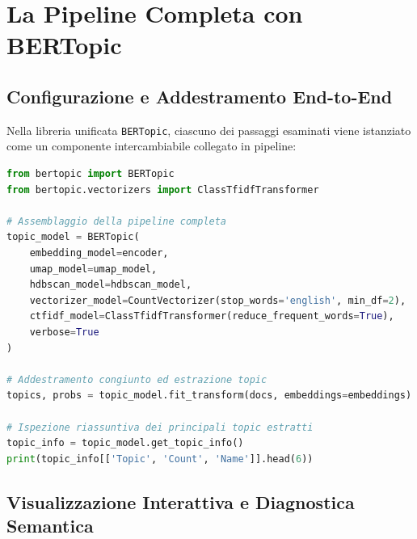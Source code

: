 \FloatBarrier
\section{La Pipeline Completa con BERTopic}
\label{sec:lab-bertopic-pipeline}

\FloatBarrier
\subsection{Configurazione e Addestramento End-to-End}
\label{subsec:lab-bertopic-training}

Nella libreria unificata \texttt{BERTopic}, ciascuno dei passaggi esaminati viene istanziato come un componente intercambiabile collegato in pipeline:

\begin{lstlisting}[language=Python, caption={Inizializzazione ed esecuzione della pipeline modulare BERTopic.}]
from bertopic import BERTopic
from bertopic.vectorizers import ClassTfidfTransformer

# Assemblaggio della pipeline completa
topic_model = BERTopic(
    embedding_model=encoder,
    umap_model=umap_model,
    hdbscan_model=hdbscan_model,
    vectorizer_model=CountVectorizer(stop_words='english', min_df=2),
    ctfidf_model=ClassTfidfTransformer(reduce_frequent_words=True),
    verbose=True
)

# Addestramento congiunto ed estrazione topic
topics, probs = topic_model.fit_transform(docs, embeddings=embeddings)

# Ispezione riassuntiva dei principali topic estratti
topic_info = topic_model.get_topic_info()
print(topic_info[['Topic', 'Count', 'Name']].head(6))
\end{lstlisting}

\FloatBarrier
\subsection{Visualizzazione Interattiva e Diagnostica Semantica}
\label{subsec:lab-visualizations}

